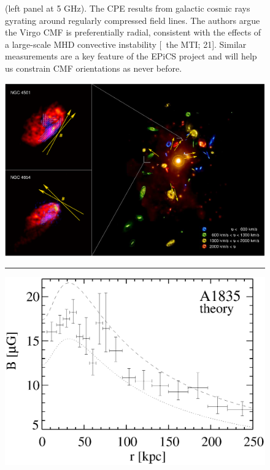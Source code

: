 \begin{figure}
\begin{center}
\begin{minipage}{0.495\linewidth}
{        (left panel at 5 GHz). The CPE results from galactic cosmic
        rays gyrating around regularly compressed field lines. The
        authors argue the Virgo CMF is preferentially radial,
        consistent with the effects of a large-scale MHD convective
        instability [\ie\ the MTI; 21]. Similar measurements are a key
        feature of the EPiCS project and will help us constrain CMF
        orientations as never before.}
    \end{minipage}
    \vspace{0.2cm}
    \begin{minipage}{0.495\linewidth}
      \includegraphics*[width=\linewidth, trim=0mm 0mm 0mm 0mm, clip]{pfrommer.ps}
    \end{minipage}
    \rule{\linewidth}{1pt}
    \begin{minipage}{0.495\linewidth}
      \includegraphics*[width=\linewidth, trim=10mm 4mm 2mm 5mm, clip]{kunz.eps}

\end{minipage}
\end{center}
\end{figure}
